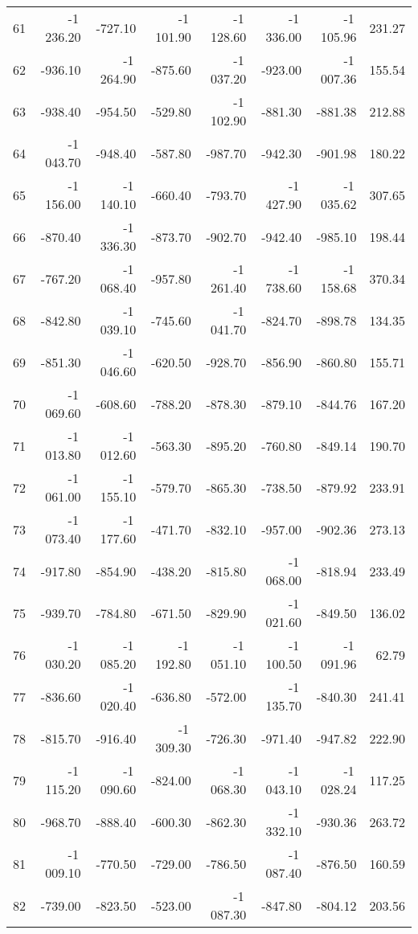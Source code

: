 \begin{longtable}{rrrrrrrr}
61 & -1\,236.20 & -727.10 & -1\,101.90 & -1\,128.60 & -1\,336.00 & -1\,105.96 & 231.27  \\
62 & -936.10 & -1\,264.90 & -875.60 & -1\,037.20 & -923.00 & -1\,007.36 & 155.54  \\
63 & -938.40 & -954.50 & -529.80 & -1\,102.90 & -881.30 & -881.38 & 212.88  \\
64 & -1\,043.70 & -948.40 & -587.80 & -987.70 & -942.30 & -901.98 & 180.22  \\
65 & -1\,156.00 & -1\,140.10 & -660.40 & -793.70 & -1\,427.90 & -1\,035.62 & 307.65  \\
66 & -870.40 & -1\,336.30 & -873.70 & -902.70 & -942.40 & -985.10 & 198.44  \\
67 & -767.20 & -1\,068.40 & -957.80 & -1\,261.40 & -1\,738.60 & -1\,158.68 & 370.34  \\
68 & -842.80 & -1\,039.10 & -745.60 & -1\,041.70 & -824.70 & -898.78 & 134.35  \\
69 & -851.30 & -1\,046.60 & -620.50 & -928.70 & -856.90 & -860.80 & 155.71  \\
70 & -1\,069.60 & -608.60 & -788.20 & -878.30 & -879.10 & -844.76 & 167.20  \\
71 & -1\,013.80 & -1\,012.60 & -563.30 & -895.20 & -760.80 & -849.14 & 190.70  \\
72 & -1\,061.00 & -1\,155.10 & -579.70 & -865.30 & -738.50 & -879.92 & 233.91  \\
73 & -1\,073.40 & -1\,177.60 & -471.70 & -832.10 & -957.00 & -902.36 & 273.13  \\
74 & -917.80 & -854.90 & -438.20 & -815.80 & -1\,068.00 & -818.94 & 233.49  \\
75 & -939.70 & -784.80 & -671.50 & -829.90 & -1\,021.60 & -849.50 & 136.02  \\
76 & -1\,030.20 & -1\,085.20 & -1\,192.80 & -1\,051.10 & -1\,100.50 & -1\,091.96 & 62.79  \\
77 & -836.60 & -1\,020.40 & -636.80 & -572.00 & -1\,135.70 & -840.30 & 241.41  \\
78 & -815.70 & -916.40 & -1\,309.30 & -726.30 & -971.40 & -947.82 & 222.90  \\
79 & -1\,115.20 & -1\,090.60 & -824.00 & -1\,068.30 & -1\,043.10 & -1\,028.24 & 117.25  \\
80 & -968.70 & -888.40 & -600.30 & -862.30 & -1\,332.10 & -930.36 & 263.72  \\
81 & -1\,009.10 & -770.50 & -729.00 & -786.50 & -1\,087.40 & -876.50 & 160.59  \\
82 & -739.00 & -823.50 & -523.00 & -1\,087.30 & -847.80 & -804.12 & 203.56  \\

\end{longtable}
